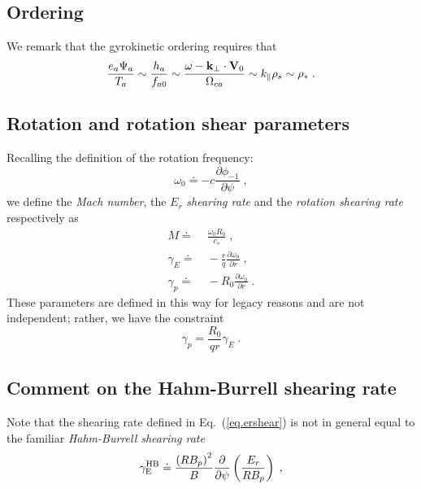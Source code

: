 \subsection{Ordering}

We remark that the gyrokinetic ordering requires that 
%
\begin{equation}
\frac{e_a \Psi_a}{T_a} \sim \frac{h_a}{f_{a0}} 
\sim \frac{\omega - {\bf k}_\perp \cdot {\bf V}_0}{\Omega_{ca}} 
\sim k_\parallel \rho_s \sim \rho_* \; .  
\label{eq.ordrho}
\end{equation}

\subsection{Rotation and rotation shear parameters}

Recalling the definition of the rotation frequency:
%
\begin{equation}
\omega_0 \doteq -c \frac{\partial\phi_{-1}}{\partial\psi} \; , 
\end{equation}
%
we define the {\it Mach number}, the $E_r$ {\it shearing rate} and 
the {\it rotation shearing rate} respectively as
%
\begin{align}
M \doteq &~\frac{\omega_0 R_0}{c_s} 
 \; , \\
\gamma_E \doteq &~-\frac{r}{q} \frac{\partial\omega_0}{\partial r} 
 \; ,\label{eq.ershear}\\
\gamma_p \doteq &~-R_0 \frac{\partial\omega_0}{\partial r} \; .
\end{align}
%
These parameters are defined in this way for legacy reasons and 
are not independent; rather, we have the constraint
%
\begin{equation}
\gamma_p = \frac{R_0}{q r} \gamma_E \; .
\end{equation}

\subsection{Comment on the Hahm-Burrell shearing rate}

\noindent
Note that the shearing rate defined in Eq.~(\ref{eq.ershear}) is not 
in general equal to the familiar {\it Hahm-Burrell shearing rate} 
\cite{burrell:1997} 
%
\begin{equation}
\gamma_{\rm E}^{\rm HB} \doteq \frac{\left(R B_p\right)^2}{B}
\frac{\partial}{\partial \psi} \left( \frac{E_r}{R B_p} \right) \; ,
\end{equation}

